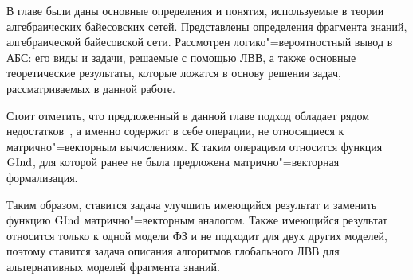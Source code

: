 В главе были даны основные определения и понятия, используемые в теории алгебраических байесовских сетей. Представлены определения фрагмента знаний, алгебраической байесовской сети. Рассмотрен логико"=вероятностный вывод в АБС: его виды и задачи, решаемые с помощью ЛВВ, а также основные теоретические результаты, которые ложатся в основу решения задач, рассматриваемых в данной работе.

Стоит отметить, что предложенный в данной главе подход обладает рядом недостатков~\cite{70}, а именно содержит в себе операции, не относящиеся к матрично"=векторным вычислениям. К таким операциям относится функция $\mathrm{GInd}$, для которой ранее не была предложена матрично"=векторная формализация. 

Таким образом, ставится задача улучшить имеющийся результат и заменить функцию $\mathrm{GInd}$ матрично"=векторным аналогом. Также имеющийся результат относится только к одной модели ФЗ и не подходит для двух других моделей, поэтому ставится задача описания алгоритмов глобального ЛВВ для альтернативных моделей фрагмента знаний.